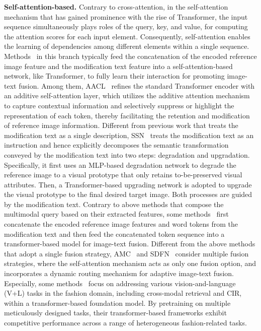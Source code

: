 \textbf{Self-attention-based.} 
Contrary to cross-attention, in the self-attention mechanism that has gained prominence with the rise of Transformer, the input sequence simultaneously plays roles of the query, key, and value, for computing the attention scores for each input element. Consequently, self-attention enables the learning of dependencies among different elements within a single sequence. Methods~\cite{mirchandani2022fad,tian2023aacl,han2023fame,zhao2024neucore,udhayanan2023lmga,chen2024fashionern,wen2023limn,song2024syncmask,yang2024ssn,zhao2024unifashion} in this branch typically feed the concatenation of the encoded reference image feature and the modification text feature into a self-attention-based network, like Transformer, to fully learn their interaction for promoting image-text fusion. 
Among them, AACL~\cite{tian2023aacl} refines the standard Transformer encoder with an additive self-attention layer, which utilizes the additive attention mechanism to capture contextual information and selectively suppress or highlight the representation of each token, thereby facilitating the retention and modification of reference image information. 
Different from previous work that treats the modification text as a single description, SSN~\cite{yang2024ssn} treats the modification text as an instruction and hence explicitly decomposes the semantic transformation conveyed by the modification text into two steps: degradation and upgradation. Specifically, it first uses an MLP-based degradation network to degrade the reference image to a visual prototype that only retains to-be-preserved visual attributes. Then, a Transformer-based upgrading network is adopted to upgrade the visual prototype to the final desired target image. Both processes are guided by the modification text. 
Contrary to above methods that compose the multimodal query based on their extracted features, some methods~\cite{liu2021CIRPLANT,goenka2022fashionvlp,xusentence2024sprc,zhou2024vista,han2022fashionvil} first concatenate the encoded reference image features and word tokens from the modification text
and then feed the concatenated token sequence into a transformer-based model for image-text fusion.
Different from the above methods that adopt a single fusion strategy, AMC~\cite{zhu2023amc} and SDFN~\cite{wu2024sdfn} consider multiple fusion strategies, where the self-attention mechanism acts as only one fusion option, and incorporates a dynamic routing mechanism for adaptive image-text fusion. 
Especially, some methods~\cite{mirchandani2022fad,song2024syncmask,han2023fame} focus on addressing various vision-and-language (V+L) tasks in the fashion domain, including cross-modal retrieval and CIR, within a transformer-based foundation model. By pretraining on multiple meticulously designed tasks, their transformer-based frameworks exhibit competitive performance across a range of heterogeneous fashion-related tasks. 


